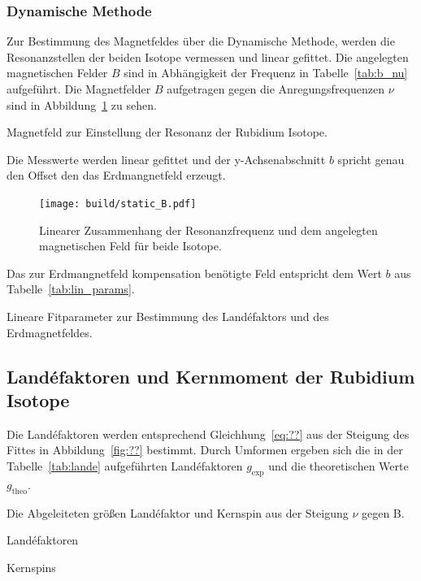 \subsubsection{Dynamische Methode}%
\label{ssub:dynamische_methode}
Zur Bestimmung des Magnetfeldes über die Dynamische Methode, werden die
Resonanzstellen der beiden Isotope vermessen und linear gefittet.
Die angelegten magnetischen Felder $B$ sind in Abhängigkeit der Frequenz in
Tabelle~\ref{tab:b_nu} aufgeführt.
Die Magnetfelder $B$ aufgetragen gegen die Anregungsfrequenzen $\nu$ sind in
Abbildung~\ref{fig:static_B} zu sehen.

\begin{table}[h]
	\centering
	\caption{Magnetfeld zur Einstellung der Resonanz der Rubidium Isotope.}
	\label{tab:b_nu}
		
\end{table}

Die Messwerte werden linear gefittet und der y-Achsenabschnitt $b$ spricht genau den
Offset den das Erdmangnetfeld erzeugt.
\begin{figure}[h]
	\centering
	\texttt{[image: build/static\_B.pdf]}
	\caption{Linearer Zusammenhang der Resonanzfrequenz und dem angelegten
	magnetischen Feld für beide Isotope.}
	\label{fig:static_B}
\end{figure}
Das zur Erdmangnetfeld kompensation benötigte Feld entspricht dem Wert $b$ aus
Tabelle~\ref{tab:lin_params}.

\begin{table}[h]
	\centering
	\caption{Lineare Fitparameter zur Bestimmung des Land\'efaktors und des
	Erdmagnetfeldes.}
	\label{tab:lin_params}
	
\end{table}



\subsection{Land\'efaktoren und Kernmoment der Rubidium Isotope}%
\label{sub:landefaktoren_der_rubidium_isotope}
Die Land\'efaktoren werden entsprechend Gleichhung~\ref{eq:??} aus der Steigung
des Fittes in Abbildung~\ref{fig:??} bestimmt. 
Durch Umformen ergeben sich die in der Tabelle~\ref{tab:lande} aufgeführten
Land\'efaktoren $g_\text{exp}$ und die theoretischen Werte $g_\text{theo}$.


\begin{table}[h]
	\centering
	\caption{Die Abgeleiteten größen Land\'efaktor und Kernspin aus der Steigung
	$\nu$ gegen B.}
	\label{tab:lande}
	\begin{subtable}[t]{0.4\textwidth}
	\centering
	\caption{Land\'efaktoren}
	\label{tab:label}
	
	\end{subtable}
	\begin{subtable}[t]{0.4\textwidth}
	\centering
	\caption{Kernspins}
	\label{tab:label}
	
	\end{subtable}
\end{table}


